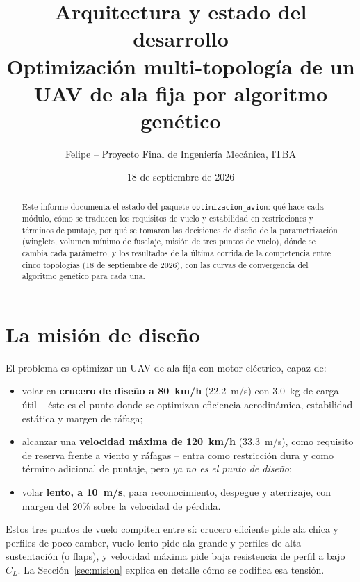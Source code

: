 \documentclass[11pt,a4paper]{article}
\title{\textbf{Arquitectura y estado del desarrollo}\\[2mm]
\Large Optimización multi-topología de un UAV de ala fija por algoritmo genético}
\author{Felipe -- Proyecto Final de Ingeniería Mecánica, ITBA}
\date{18 de septiembre de 2026}
\begin{document}
\maketitle

\begin{abstract}
\noindent Este informe documenta el estado del paquete \texttt{optimizacion\_avion}: qué hace cada módulo, cómo se traducen los requisitos de vuelo y estabilidad en restricciones y términos de puntaje, por qué se tomaron las decisiones de diseño de la parametrización (winglets, volumen mínimo de fuselaje, misión de tres puntos de vuelo), dónde se cambia cada parámetro, y los resultados de la última corrida de la competencia entre cinco topologías (18 de septiembre de 2026), con las curvas de convergencia del algoritmo genético para cada una.
\end{abstract}

\tableofcontents

\section{La misión de diseño}

El problema es optimizar un UAV de ala fija con motor eléctrico, capaz de:

\begin{itemize}[nosep]
  \item volar en \textbf{crucero de diseño a 80~km/h} (22.2~m/s) con 3.0~kg de carga útil -- éste es el punto donde se optimizan eficiencia aerodinámica, estabilidad estática y margen de ráfaga;
  \item alcanzar una \textbf{velocidad máxima de 120~km/h} (33.3~m/s), como requisito de reserva frente a viento y ráfagas -- entra como restricción dura y como término adicional de puntaje, pero \emph{ya no es el punto de diseño};
  \item volar \textbf{lento, a 10~m/s}, para reconocimiento, despegue y aterrizaje, con margen del 20\% sobre la velocidad de pérdida.
\end{itemize}

Estos tres puntos de vuelo compiten entre sí: crucero eficiente pide ala chica y perfiles de poco camber, vuelo lento pide ala grande y perfiles de alta sustentación (o flaps), y velocidad máxima pide baja resistencia de perfil a bajo $C_L$. La Sección~\ref{sec:mision} explica en detalle cómo se codifica esa tensión.
\end{document}
